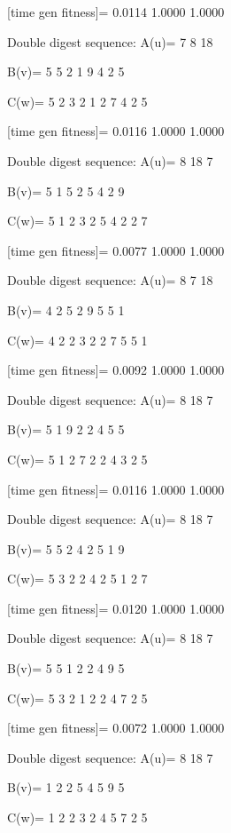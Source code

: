 [time gen fitness]=
    0.0114    1.0000    1.0000

Double digest sequence:
A(u)=
     7     8    18

B(v)=
     5     5     2     1     9     4     2     5

C(w)=
     5     2     3     2     1     2     7     4     2     5

[time gen fitness]=
    0.0116    1.0000    1.0000

Double digest sequence:
A(u)=
     8    18     7

B(v)=
     5     1     5     2     5     4     2     9

C(w)=
     5     1     2     3     2     5     4     2     2     7

[time gen fitness]=
    0.0077    1.0000    1.0000

Double digest sequence:
A(u)=
     8     7    18

B(v)=
     4     2     5     2     9     5     5     1

C(w)=
     4     2     2     3     2     2     7     5     5     1

[time gen fitness]=
    0.0092    1.0000    1.0000

Double digest sequence:
A(u)=
     8    18     7

B(v)=
     5     1     9     2     2     4     5     5

C(w)=
     5     1     2     7     2     2     4     3     2     5

[time gen fitness]=
    0.0116    1.0000    1.0000

Double digest sequence:
A(u)=
     8    18     7

B(v)=
     5     5     2     4     2     5     1     9

C(w)=
     5     3     2     2     4     2     5     1     2     7

[time gen fitness]=
    0.0120    1.0000    1.0000

Double digest sequence:
A(u)=
     8    18     7

B(v)=
     5     5     1     2     2     4     9     5

C(w)=
     5     3     2     1     2     2     4     7     2     5

[time gen fitness]=
    0.0072    1.0000    1.0000

Double digest sequence:
A(u)=
     8    18     7

B(v)=
     1     2     2     5     4     5     9     5

C(w)=
     1     2     2     3     2     4     5     7     2     5

